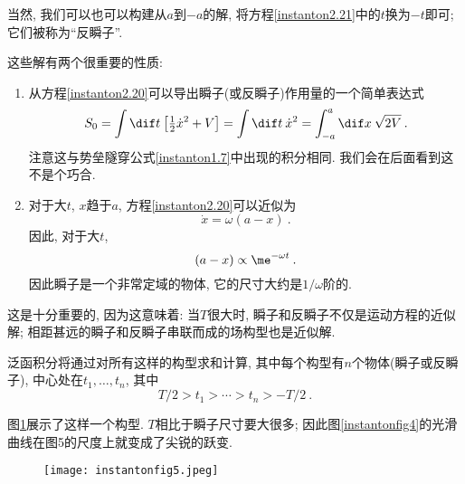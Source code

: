 当然, 我们可以也可以构建从$a$到${-}a$的解, 将方程\eqref{instanton2.21}中的$t$换为$-t$即可; 它们被称为``反瞬子''.

这些解有两个很重要的性质:
\begin{enumerate}
    \item 从方程\eqref{instanton2.20}可以导出瞬子(或反瞬子)作用量的一个简单表达式
    \begin{equation}
        S_{0}=\int \dif t\:\bigl[\tfrac{1}{2}\dot{x}^{2}+V\bigr] =\int \dif t \: \dot{x}^{2} = \int_{-a}^{a}\dif x\:\sqrt{2V} \:. \label{instanton2.22}
    \end{equation}
    注意这与势垒隧穿公式\eqref{instanton1.7}中出现的积分相同. 我们会在后面看到这不是个巧合.
    \item 对于大$t$, $x$趋于$a$, 方程\eqref{instanton2.20}可以近似为
    \begin{equation}
        \dot{x} = \omega(a-x) \:. \label{instanton2.23}
    \end{equation}
    因此, 对于大$t$,
    \begin{equation}
        (a-x) \propto \me^{-\omega t} \:. \label{instanton2.24}
    \end{equation}
    因此瞬子是一个非常定域的物体, 它的尺寸大约是$1/\omega$阶的.
\end{enumerate}

这是十分重要的, 因为这意味着: 当$T$很大时, 瞬子和反瞬子不仅是运动方程的近似解; 相距甚远的瞬子和反瞬子串联而成的场构型也是近似解. 

泛函积分将通过对所有这样的构型求和计算, 其中每个构型有$n$个物体(瞬子或反瞬子), 中心处在$t_{1},\ldots,t_{n}$, 其中
\begin{equation}
    T/2>t_{1}>\cdots>t_{n}>-T/2\:. \label{instanton2.25}
\end{equation}

图\ref{instantonfig5}展示了这样一个构型. $T$相比于瞬子尺寸要大很多; 因此图\ref{instantonfig4}的光滑曲线在图5的尺度上就变成了尖锐的跃变. 

\begin{figure}[h]
    \centering
    \texttt{[image: instantonfig5.jpeg]}
    \caption{ \label{instantonfig5}}
  \end{figure}

